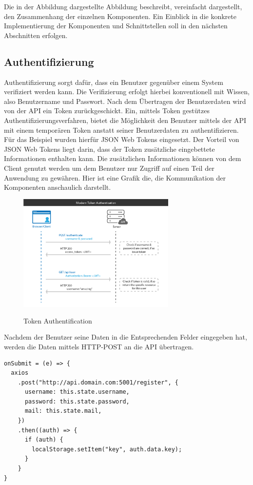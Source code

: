 \documentclass[utf8,biblatex]{lni}
\begin{document}
Die in der Abbildung dargestellte Abbildung beschreibt, vereinfacht dargestellt, den Zusammenhang der einzelnen Komponenten. 
Ein Einblick in die konkrete Implementierung der Komponenten und Schnittstellen soll in den nächsten Abschnitten erfolgen. 

\subsection{Authentifizierung}

Authentifizierung sorgt dafür, dass ein Benutzer gegenüber einem System verifiziert werden kann.
Die Verifizierung erfolgt hierbei konventionell mit Wissen, also Benutzername und Passwort.
Nach dem Übertragen der Benutzerdaten wird von der API ein Token zurückgeschickt.
Ein, mittels Token gestützes Authentifizierungsverfahren, bietet die Möglichkeit den Benutzer mittels 
der API mit einem temporären Token anstatt seiner Benutzerdaten zu authentifizieren. 
Für das Beispiel wurden hierfür JSON Web Tokens \cite{JWT} eingesetzt. 
Der Vorteil von JSON Web Tokens liegt darin, dass der Token zusätzliche eingebettete Informationen
enthalten kann. 
Die zusätzlichen Informationen können von dem Client genutzt werden um dem Benutzer 
nur Zugriff auf einen Teil der Anwendung zu gewähren. 
Hier ist eine Grafik die, die Kommunikation der Komponenten anschaulich darstellt.
\newpage
\begin{figure}
  \centering
  \includegraphics[width=0.7\textwidth]{images/token-auth.png}
  \caption[Token Authentification]{Token Authentification} 
  \label{token-auth}
  \cite{OktaJWTAuth}
\end{figure} 

Nachdem der Benutzer seine Daten in die Entsprechenden Felder eingegeben hat, werden die Daten 
mittels HTTP-POST an die API übertragen.

\begin{verbatim}
onSubmit = (e) => {
  axios
    .post("http://api.domain.com:5001/register", {
      username: this.state.username,
      password: this.state.password,
      mail: this.state.mail,
    })
    .then((auth) => {
      if (auth) {
        localStorage.setItem("key", auth.data.key);
      }
    }
}
\end{verbatim}
\end{document}
